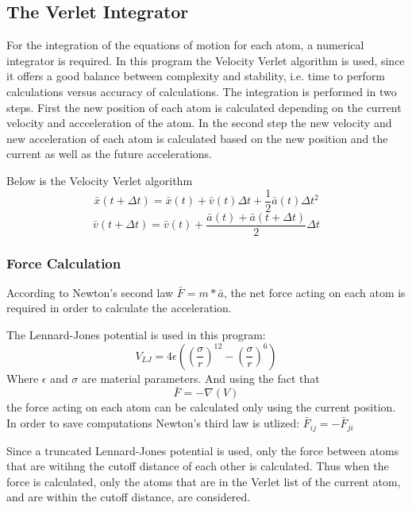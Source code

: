 \subsection{The Verlet Integrator}
For the integration of the equations of motion for each atom, a numerical integrator is required. In this program the Velocity Verlet algorithm is used, since it offers a good balance between complexity and stability, i.e. time to perform calculations versus accuracy of calculations. The integration is performed in two steps. First the new position of each atom is calculated depending on the current velocity and accceleration of the atom. In the second step the new velocity and new acceleration of each atom is calculated based on the new position and the current as well as the future accelerations.

Below is the Velocity Verlet algorithm
\begin{equation}
\bar{x}(t + \Delta t) = \bar{x}(t) + \bar{v}(t)\Delta t +
\frac{1}{2}\bar{a}(t)\Delta t^2
\end{equation}
\begin{equation}
\bar{v}(t + \Delta t) = \bar{v}(t) + \frac{\bar{a}(t) + \bar{a}(t+\Delta t)}{2}\Delta t
\end{equation}

\subsubsection{Force Calculation}
According to Newton's second law $\bar{F} = m*\bar{a}$, the net force acting on
each atom is required in order to calculate the acceleration.

The Lennard-Jones potential is used in this program:
\begin{equation}
V_{LJ} = 4\epsilon\left( \left(\frac{\sigma}{r}\right)^{12} - \left(
\frac{\sigma}{r} \right)^6 \right)
\end{equation}
Where $\epsilon$ and $\sigma$ are material parameters.
And using the fact that 
\begin{equation}
\bar{F} = -\nabla(V)
\end{equation}
the force acting on each atom can be calculated only using the current position.
In order to save computations Newton's third law is utlized: $\bar{F}_{ij} = -
\bar{F}_{ji}$

Since a truncated Lennard-Jones potential is used, only the force between atoms that are witihng the cutoff distance of each other is calculated. Thus when the force is calculated, only the atoms that are in the Verlet list of the current atom, and are within the cutoff distance, are considered.

